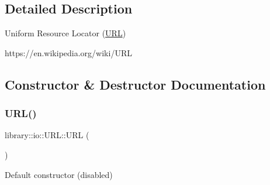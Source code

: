 \subsection{Detailed Description}
Uniform Resource Locator (\hyperlink{classlibrary_1_1io_1_1_u_r_l}{U\+RL}) 

https\+://en.wikipedia.\+org/wiki/\+U\+RL 

\subsection{Constructor \& Destructor Documentation}
\mbox{\label{classlibrary_1_1io_1_1_u_r_l_a7e9c070138a6dbd000ffb10b7cd8a5c4}} 
\subsubsection{\texorpdfstring{U\+R\+L()}{URL()}\hspace{0.1cm}{\footnotesize\ttfamily [1/2]}}
{\footnotesize\ttfamily library\+::io\+::\+U\+R\+L\+::\+U\+RL (\begin{DoxyParamCaption}{ }\end{DoxyParamCaption})\hspace{0.3cm}{\ttfamily [delete]}}



Default constructor (disabled) 

\mbox{\label{classlibrary_1_1io_1_1_u_r_l_a9ea51e79794584e9feb34a679913b091}} 
